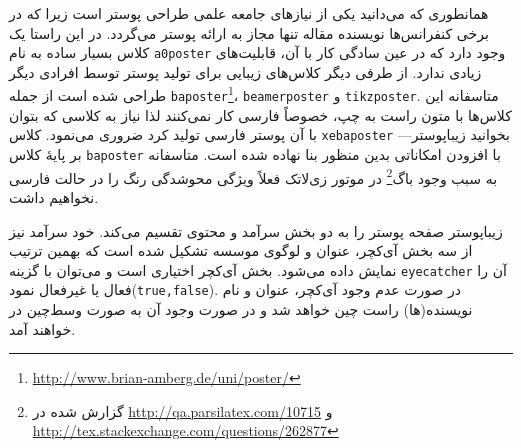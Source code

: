 \documentclass[landscape,debug,paperwidth=1510mm, paperheight=955mm,]{xebaposter}
\begin{document}
\begin{poster}
\begin{posterbox}[name=introduction,column=0,row=0,headershape=smallrounded,
headershade=plain]%
{}
همانطوری که می‌دانید یکی از نیازهای جامعه علمی طراحی پوستر است زیرا که در برخی کنفرانس‌ها نویسنده مقاله تنها مجاز به ارائه پوستر
می‌گردد. در این راستا یک کلاس بسیار ساده به نام \texttt{a0poster} وجود دارد که در عین سادگی کار با آن، قابلیت‌های زیادی ندارد.
از طرفی دیگر کلاس‌های زیبایی برای تولید پوستر توسط افرادی دیگر طراحی شده است
از جمله \texttt{baposter}\footnote{\url{http://www.brian-amberg.de/uni/poster/}}،
\texttt{beamerposter} و \texttt{tikzposter}.
متاسفانه این کلاس‌ها با متون راست به چپ، خصوصاً فارسی کار نمی‌کنند لذا نیاز به کلاسی که بتوان با آن پوستر فارسی تولید کرد
ضروری می‌نمود. کلاس \texttt{xebaposter}%
--بخوانید زیباپوستر--
 بر پایهٔ کلاس \texttt{baposter} با افزودن
امکاناتی بدین منظور بنا نهاده شده است.
متاسفانه به سبب وجود باگ‌\footnote{گزارش شده در \url{http://qa.parsilatex.com/10715}
و \url{http://tex.stackexchange.com/questions/262877}} در موتور زی‌لاتک فعلاً ویژگی محوشدگی رنگ را
در حالت فارسی نخواهیم داشت.%
\end{posterbox}
\begin{posterbox}[name=posterparts,column=0,span=1,below=introduction,textborder=roundedleft]
{}
زیباپوستر صفحه پوستر را به دو بخش سرآمد  و محتوی تقسیم می‌کند. خود سرآمد نیز از سه بخش آی‌کچر، عنوان و لوگوی موسسه تشکیل
شده است که بهمین ترتیب نمایش داده می‌شود. بخش آی‌کچر اختیاری است و می‌توان با گزینه \texttt{eyecatcher} آن را فعال یا غیرفعال
نمود(\texttt{true,false}). در صورت عدم وجود آی‌کچر، عنوان و نام نویسنده‌(ها) راست چین خواهد شد و در صورت وجود آن به صورت
وسط‌چین در خواهند آمد.


\end{posterbox}
\end{poster}
\end{document}
